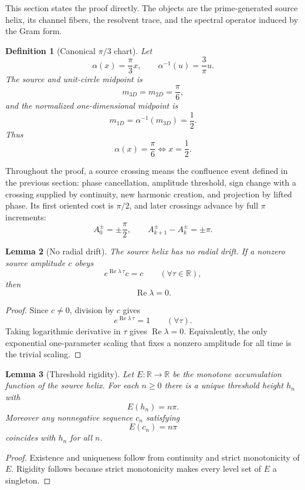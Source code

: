 \documentclass[11pt]{article}
\newtheorem{definition}{Definition}[section]
\newtheorem{lemma}[definition]{Lemma}
\DeclareMathOperator{\Ree}{Re}
\begin{document}
This section states the proof directly.  The objects
are the prime-generated source helix, its channel fibers, the resolvent trace,
and the spectral operator induced by the Gram form.

\begin{definition}[Canonical $\pi/3$ chart]
Let
\[
  \alpha(x)=\frac{\pi}{3}x,\qquad
  \alpha^{-1}(u)=\frac3\pi u.
\]
The source and unit-circle midpoint is
\[
  m_{3D}=m_{2D}=\frac{\pi}{6},
\]
and the normalized one-dimensional midpoint is
\[
  m_{1D}=\alpha^{-1}(m_{3D})=\frac12 .
\]
Thus
\[
  \alpha(x)=\frac{\pi}{6}
  \Longleftrightarrow
  x=\frac12 .
\]
\end{definition}

Throughout the proof, a source crossing means the confluence event defined in
the previous section: phase cancellation, amplitude threshold, sign change
with a crossing supplied by continuity, new harmonic creation, and projection
by lifted phase.  Its first oriented
cost is $\pi/2$, and later crossings advance by full $\pi$ increments:
\[
  A_0^\pm=\pm\frac{\pi}{2},\qquad
  A_{k+1}^\pm-A_k^\pm=\pm\pi .
\]

\begin{lemma}[No radial drift]
The source helix has no radial drift.  If a nonzero source amplitude $c$ obeys
\[
  e^{\Ree\lambda\,\tau}c=c
  \qquad(\forall \tau\in\mathbb R),
\]
then
\[
  \Ree\lambda=0.
\]
\end{lemma}

\begin{proof}
Since $c\ne0$, division by $c$ gives
\[
  e^{\Ree\lambda\,\tau}=1
  \qquad(\forall \tau).
\]
Taking logarithmic derivative in $\tau$ gives $\Ree\lambda=0$.  Equivalently,
the only exponential one-parameter scaling that fixes a nonzero amplitude for
all time is the trivial scaling.
\end{proof}

\begin{lemma}[Threshold rigidity]
Let $E:\mathbb R\to\mathbb R$ be the monotone accumulation function of the
source helix.  For each $n\ge0$ there is a unique threshold height $h_n$ with
\[
  E(h_n)=n\pi.
\]
Moreover any nonnegative sequence $c_n$ satisfying
\[
  E(c_n)=n\pi
\]
coincides with $h_n$ for all $n$.
\end{lemma}

\begin{proof}
Existence and uniqueness follow from continuity and strict monotonicity of
$E$.  Rigidity follows because strict monotonicity makes every level set of
$E$ a singleton.
\end{proof}
\end{document}
